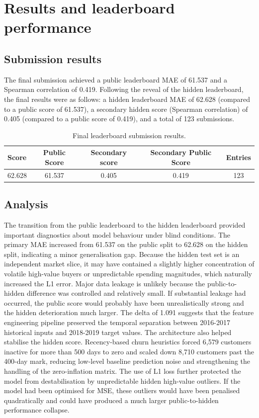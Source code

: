 \section{Results and leaderboard performance}
\subsection{Submission results}
The final submission achieved a public leaderboard MAE of 61.537 and a Spearman correlation of 0.419. Following the reveal of the hidden leaderboard, the final results were as follows: a hidden leaderboard MAE of 62.628 (compared to a public score of 61.537), a secondary hidden score (Spearman correlation) of 0.405 (compared to a public score of 0.419), and a total of 123 submissions.

\begin{table}[H]
    \centering
    \begin{tabular}{l c c c c}
        \toprule
        Score & Public Score & Secondary score & Secondary Public Score & Entries \\
        \midrule
        62.628 & 61.537 & 0.405 & 0.419 & 123 \\
        \bottomrule
    \end{tabular}
    \caption{Final leaderboard submission results.}
    \label{tab:leaderboard_results}
\end{table}



\subsection{Analysis}
The transition from the public leaderboard to the hidden leaderboard provided important diagnostics about model behaviour under blind conditions. The primary MAE increased from 61.537 on the public split to 62.628 on the hidden split, indicating a minor generalisation gap. Because the hidden test set is an independent market slice, it may have contained a slightly higher concentration of volatile high-value buyers or unpredictable spending magnitudes, which naturally increased the L1 error.
Major data leakage is unlikely because the public-to-hidden difference was controlled and relatively small. If substantial leakage had occurred, the public score would probably have been unrealistically strong and the hidden deterioration much larger. The delta of 1.091 suggests that the feature engineering pipeline preserved the temporal separation between 2016-2017 historical inputs and 2018-2019 target values.
The architecture also helped stabilise the hidden score. Recency-based churn heuristics forced 6,579 customers inactive for more than 500 days to zero and scaled down 8,710 customers past the 400-day mark, reducing low-level baseline prediction noise and strengthening the handling of the zero-inflation matrix. The use of L1 loss further protected the model from destabilisation by unpredictable hidden high-value outliers. If the model had been optimised for MSE, these outliers would have been penalised quadratically and could have produced a much larger public-to-hidden performance collapse.


